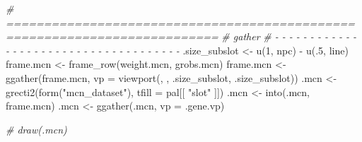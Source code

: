 \documentclass[
]{article}
\newenvironment{Shaded}{\begin{snugshade}}{\end{snugshade}}
\newcommand{\AttributeTok}[1]{\textcolor[rgb]{0.77,0.63,0.00}{#1}}
\newcommand{\CommentTok}[1]{\textcolor[rgb]{0.56,0.35,0.01}{\textit{#1}}}
\newcommand{\ControlFlowTok}[1]{\textcolor[rgb]{0.13,0.29,0.53}{\textbf{#1}}}
\newcommand{\DecValTok}[1]{\textcolor[rgb]{0.00,0.00,0.81}{#1}}
\newcommand{\DocumentationTok}[1]{\textcolor[rgb]{0.56,0.35,0.01}{\textbf{\textit{#1}}}}
\newcommand{\FloatTok}[1]{\textcolor[rgb]{0.00,0.00,0.81}{#1}}
\newcommand{\FunctionTok}[1]{\textcolor[rgb]{0.00,0.00,0.00}{#1}}
\newcommand{\NormalTok}[1]{#1}
\newcommand{\OtherTok}[1]{\textcolor[rgb]{0.56,0.35,0.01}{#1}}
\newcommand{\SpecialCharTok}[1]{\textcolor[rgb]{0.00,0.00,0.00}{#1}}
\newcommand{\StringTok}[1]{\textcolor[rgb]{0.31,0.60,0.02}{#1}}
\begin{document}
\begin{Shaded}
\end{Shaded}

\begin{Shaded}
\begin{Highlighting}[]
\CommentTok{\# ==========================================================================}
\CommentTok{\# gather}
\CommentTok{\# {-} {-} {-} {-} {-} {-} {-} {-} {-} {-} {-} {-} {-} {-} {-} {-} {-} {-} {-} {-} {-} {-} {-} {-} {-} {-} {-} {-} {-} {-} {-} {-} {-} {-} {-} {-} {-}}
\NormalTok{.size\_subslot }\OtherTok{\textless{}{-}} \FunctionTok{u}\NormalTok{(}\DecValTok{1}\NormalTok{, npc) }\SpecialCharTok{{-}} \FunctionTok{u}\NormalTok{(.}\DecValTok{5}\NormalTok{, line)}
\NormalTok{frame.mcn }\OtherTok{\textless{}{-}} \FunctionTok{frame\_row}\NormalTok{(weight.mcn, grobs.mcn)}
\NormalTok{frame.mcn }\OtherTok{\textless{}{-}} \FunctionTok{ggather}\NormalTok{(frame.mcn, }\AttributeTok{vp =} \FunctionTok{viewport}\NormalTok{(, , .size\_subslot, .size\_subslot))}
\NormalTok{.mcn }\OtherTok{\textless{}{-}} \FunctionTok{grecti2}\NormalTok{(}\FunctionTok{form}\NormalTok{(}\StringTok{"mcn\_dataset"}\NormalTok{), }\AttributeTok{tfill =}\NormalTok{ pal[[ }\StringTok{"slot"}\NormalTok{ ]])}
\NormalTok{.mcn }\OtherTok{\textless{}{-}} \FunctionTok{into}\NormalTok{(.mcn, frame.mcn)}
\NormalTok{.mcn }\OtherTok{\textless{}{-}} \FunctionTok{ggather}\NormalTok{(.mcn, }\AttributeTok{vp =}\NormalTok{ .gene.vp)}

\CommentTok{\# draw(.mcn)}
\end{Highlighting}
\end{Shaded}
\end{document}
